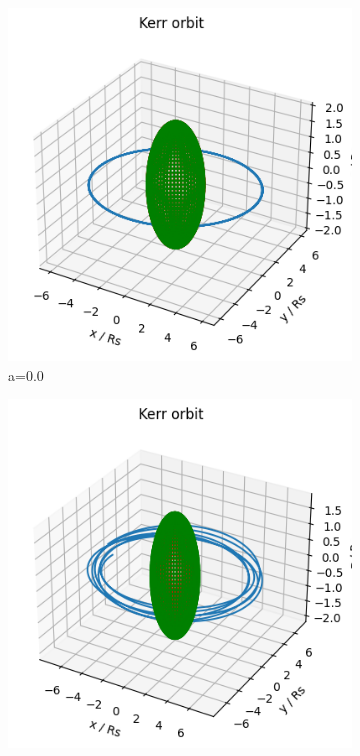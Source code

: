 \begin{figure}[h]
     \centering
     \begin{subfigure}[b]{0.3\textwidth}
         \centering
         \includegraphics[width=\textwidth]{orbits_images/kerr_a=0_del.png}
         \caption{a=0.0}
         \label{fig:Kerr orbit, a=0}
     \end{subfigure}
     \hfill
     \begin{subfigure}[b]{0.3\textwidth}
         \centering
         \includegraphics[width=\textwidth]{orbits_images/kerr_a=0.5.png}

\end{subfigure}
\end{figure}
